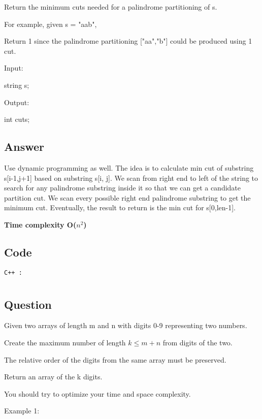 Return the minimum cuts needed for a palindrome partitioning of s.

For example, given s = "aab",

Return 1 since the palindrome partitioning ["aa","b"] could be produced using 1 cut.

Input:

string s;

Output:

int cuts;

\subsection{Answer}
Use dynamic programming as well.
The idea is to calculate min cut of substring s[i-1,j+1] based on substring s[i, j]. We scan from right end to left of the string to search for any palindrome substring inside it so that we can get a candidate partition cut. We scan every possible right end palindrome substring to get the minimum cut. Eventually, the result to return is the min cut for s[0,len-1].

\textbf{\color{red}Time complexity O($n^2$)}
\subsection{Code}
\texttt{C++ :}



\section{}
\subsection{Question}
Given two arrays of length m and n with digits 0-9 representing two numbers.

Create the maximum number of length $ k \leq m + n $ from digits of the two.

The relative order of the digits from the same array must be preserved.

Return an array of the k digits.

You should try to optimize your time and space complexity.

Example 1:


